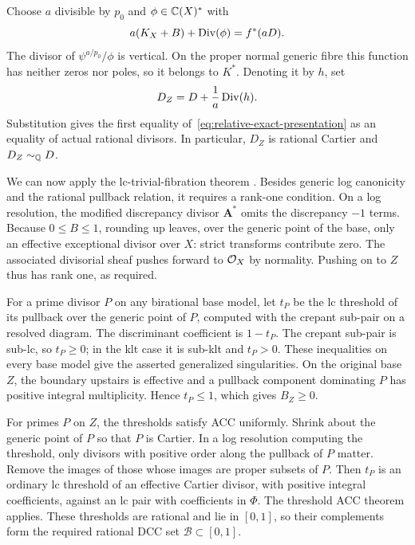 Choose $a$ divisible by $p_0$ and $\phi\in\mathbb C(X)^*$ with
\[
 a(K_X+B)+\operatorname{Div}(\phi)=f^*(aD).
\]
The divisor of $\psi^{a/p_0}/\phi$ is vertical.  On the proper normal
generic fibre this function has neither zeros nor poles, so it belongs
to $K^*$.  Denoting it by $h$, set
\[
 D_Z=D+\frac1a\operatorname{Div}(h).
\]
Substitution gives the first equality
of~\eqref{eq:relative-exact-presentation} as an equality of actual
rational divisors.  In particular, $D_Z$ is rational Cartier and
$D_Z\sim_\mathbb Q D$.

We can now apply the lc-trivial-fibration theorem
\cite[Theorem~3.6]{FujinoGongyoModuli}.  Besides generic log canonicity
and the rational pullback relation, it requires a rank-one condition.
On a log resolution, the modified discrepancy divisor $\mathbf A^*$
omits the discrepancy $-1$ terms.  Because $0\leq B\leq1$,
rounding up leaves, over the generic point of the base, only an
effective exceptional divisor over $X$: strict transforms contribute
zero.  The associated divisorial sheaf pushes forward to $\mathcal O_X$ by
normality.  Pushing on to $Z$ thus has rank one, as required.

For a prime divisor $P$ on any birational base model, let $t_P$ be the lc
threshold of its pullback over the generic point of $P$, computed with
the crepant sub-pair on a resolved diagram.  The discriminant
coefficient is $1-t_P$.  The crepant sub-pair is sub-lc, so $t_P\geq0$;
in the klt case it is sub-klt and $t_P>0$.  These inequalities on every base model give
the asserted generalized singularities.  On the original base $Z$,
the boundary upstairs is effective and a pullback component
dominating $P$ has positive integral multiplicity.  Hence $t_P\leq1$,
which gives $B_Z\geq0$.

For primes $P$ on $Z$, the thresholds satisfy ACC uniformly.  Shrink
about the generic point of $P$ so that $P$ is Cartier.  In a log
resolution computing the threshold, only divisors with positive order
along the pullback of $P$ matter.  Remove the images of those whose
images are proper subsets of $P$.  Then $t_P$ is an ordinary lc threshold of an effective
Cartier divisor, with positive integral coefficients, against an lc
pair with coefficients in $\Phi$.  The threshold ACC theorem
\cite[Theorem~1.1]{HMX2014} applies.  These thresholds are rational
and lie in $[0,1]$, so their complements form the required rational
DCC set $\mathcal B\subset[0,1]$.

